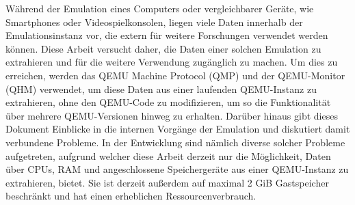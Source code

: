 
\Abstract
Während der Emulation eines Computers oder vergleichbarer Geräte, wie Smartphones oder Videospielkonsolen,
liegen viele Daten innerhalb der Emulationsinstanz vor, die extern für weitere Forschungen verwendet werden können.
Diese Arbeit versucht daher, die Daten einer solchen Emulation zu extrahieren und für die weitere Verwendung zugänglich zu machen.
Um dies zu erreichen, werden das QEMU Machine Protocol (QMP) und der QEMU-Monitor (QHM) verwendet, um diese Daten aus einer laufenden QEMU-Instanz zu extrahieren,
ohne den QEMU-Code zu modifizieren, um so die Funktionalität über mehrere QEMU-Versionen hinweg zu erhalten.
Darüber hinaus gibt dieses Dokument Einblicke in die internen Vorgänge der Emulation und diskutiert damit verbundene Probleme.
In der Entwicklung sind nämlich diverse solcher Probleme aufgetreten,
aufgrund welcher diese Arbeit derzeit nur die Möglichkeit, Daten über CPUs, RAM und angeschlossene Speichergeräte aus einer QEMU-Instanz zu extrahieren, bietet.
Sie ist derzeit außerdem auf maximal 2 GiB Gastspeicher beschränkt und hat einen erheblichen Ressourcenverbrauch.